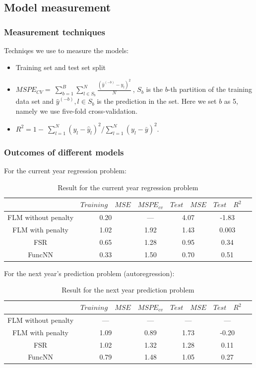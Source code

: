 \documentclass[
	9pt, %
]{beamer}
\begin{document}
\subsection{Model measurement}
\begin{frame}
	\frametitle{Measurement techniques}
	Techniqes we use to measure the models: 
	\begin{itemize}
	\item Training set and test set split
	\bigskip
	\item $MSPE_{CV}=\ \sum_{b=1}^{B}\sum_{l\in S_b}^{N}{\frac{\left({\hat{y}}^{\left(-b\right)}-y_l\right)^2}{N}\ }$, $S_b$ is the $b$-th partition of the training data set and $\hat{y}^{(-b)},l \in S_b$ is the prediction in the set. Here we set $b$ as 5, namely we use five-fold cross-validation.
	\bigskip
	\item $R^2=1-\ \sum_{l=1}^{N}{\left(y_l-{\hat{y}}_l\right)^2/\sum_{l=1}^{N}\left(y_l-\bar{y}\right)^2}.$
	\end{itemize}
\end{frame}
\begin{frame}
\frametitle{Outcomes of different models}
For the current year regression problem:
\begin{table}[!htbp]
\centering
\begin{tabular}{cccccc}
   \toprule
   &$Training \quad MSE$ & $MSPE_{cv}$ & $Test\quad MSE$ & $Test\quad R^2$ \\
   \midrule
   FLM without penalty&0.20&---&4.07&-1.83 \\
   FLM with penalty&1.02&1.92&1.43&0.003 \\
   FSR& 0.65&1.28&0.95&0.34\\
   FuncNN&0.33&1.50&0.70&0.51\\
   \bottomrule
\end{tabular}
\caption{Result for the current year regression problem}
\end{table}

For the next year's prediction problem (autoregression):


\begin{table}[!htbp]
\centering
\begin{tabular}{cccccc}
   \toprule
   &$Training\quad MSE$ & $MSPE_{cv}$ & $Test\quad MSE$ & $Test\quad R^2$ \\
   \midrule
   FLM without penalty&---&---&---&--- \\
   FLM with penalty&1.09&0.89&1.73&-0.20\\
   FSR& 1.02&1.32&1.28&0.11\\
   FuncNN&0.79 &1.48 &1.05 &0.27\\
   \bottomrule
\end{tabular}
\caption{Result for the next year prediction problem}
\end{table}
\end{frame}
\end{document}

